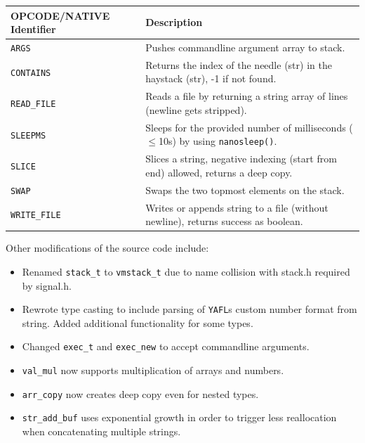 \documentclass[11pt,a4paper]{article}
\begin{document}
\vspace{1em}
\begin{center}
    \renewcommand{\arraystretch}{1.4}
\begin{tabularx}{\textwidth}{|l|X|}
  \hline
  \textbf{OPCODE/NATIVE Identifier} & \textbf{Description} \\ [0.5ex]
  \hline\hline
  \texttt{ARGS} & Pushes commandline argument array to stack. \\
  \hline
  \texttt{CONTAINS} & Returns the index of the needle (str) in the haystack (str), -1 if not found. \\
  \hline
  \texttt{READ\_FILE} & Reads a file by returning a string array of lines (newline gets stripped). \\
  \hline
  \texttt{SLEEPMS} & Sleeps for the provided number of milliseconds ($\le$10s) by using \texttt{nanosleep()}. \\
  \hline
  \texttt{SLICE} & Slices a string, negative indexing (start from end) allowed, returns a deep copy. \\
  \hline
  \texttt{SWAP} & Swaps the two topmost elements on the stack. \\
  \hline
  \texttt{WRITE\_FILE} & Writes or appends string to a file (without newline), returns success as boolean. \\ [1ex]
  \hline
\end{tabularx}
\end{center}

Other modifications of the source code include:

\begin{itemize}
    \item Renamed \texttt{stack\_t} to \texttt{vmstack\_t} due to name collision with stack.h required by signal.h.
    \item Rewrote type casting to include parsing of \texttt{YAFL}s custom number format from string.
    Added additional functionality for some types.
    \item Changed \texttt{exec\_t} and \texttt{exec\_new} to accept commandline arguments.
    \item \texttt{val\_mul} now supports multiplication of arrays and numbers.
    \item \texttt{arr\_copy} now creates deep copy even for nested types.
    \item \texttt{str\_add\_buf} uses exponential growth in order to trigger less reallocation when concatenating multiple strings.
\end{itemize}
\end{document}
